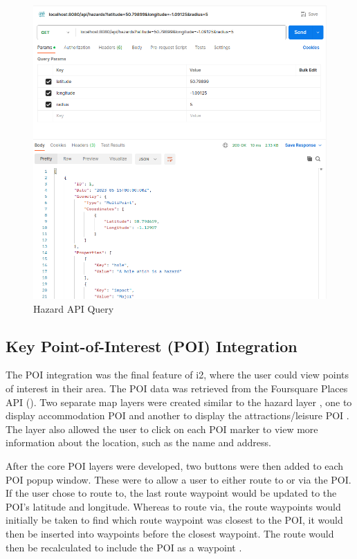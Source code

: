 \begin{figure}[!ht]
  \centering
  \includegraphics[width=425px]{figures/Progress Images/Iteration-2/SR32-37/SR32 - Basic API further developed.png}
  \caption{Hazard API Query}
  \label{fig:hazard-API}
\end{figure}

\subsection{Key Point-of-Interest (POI) Integration}
\label{iteration2:poi-integration}

The POI integration was the final feature of i2, where the user could view points of interest in their area. The POI data was retrieved from the Foursquare Places API (\cite{noauthor_places_nodate}). Two separate map layers were created similar to the hazard layer , one to display accommodation POI and another to display the attractions/leisure POI . The layer also allowed the user to click on each POI marker to view more information about the location, such as the name and address.

After the core POI layers were developed, two buttons were then added to each POI popup window. These were to allow a user to either route to or via the POI. If the user chose to route to, the last route waypoint would be updated to the POI's latitude and longitude. Whereas to route via, the route waypoints would initially be taken to find which route waypoint was closest to the POI, it would then be inserted into waypoints before the closest waypoint. The route would then be recalculated to include the POI as a waypoint .

